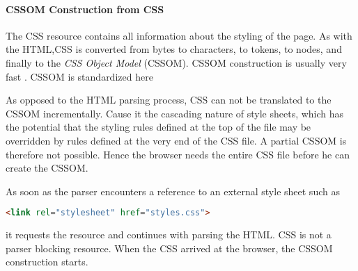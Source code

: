 

\paragraph{CSSOM Construction from CSS}



The CSS resource contains all information about the styling of the page.
As with the HTML,CSS is converted from bytes to characters, to tokens, to nodes, and finally to the \textit{CSS Object Model} (CSSOM). %
CSSOM construction is usually very fast . %
CSSOM is standardized here %





As opposed to the HTML parsing process, CSS can not be translated to the CSSOM incrementally.
Cause it the cascading nature of style sheets, which has the potential that the styling rules defined at the top of the file may be overridden by rules defined at the very end of the CSS file.
A partial CSSOM is therefore not possible.
Hence the browser needs the entire CSS file before he can create the CSSOM.



As soon as the parser encounters a reference to an external style sheet such as

\begin{lstlisting}[language=html, numbers=none]
<link rel="stylesheet" href="styles.css">
\end{lstlisting}

it requests the resource and continues with parsing the HTML.
CSS is not a parser blocking resource.
When the CSS arrived at the browser, the CSSOM construction starts.



